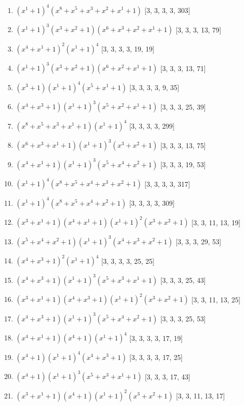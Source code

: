 \documentclass[10pt,twocolumn]{article}
\begin{document}
\begin{enumerate}
\item $(x^{1} + 1)^{4}(x^{8} + x^{5} + x^{3} + x^{2} + x^{1} + 1)$  [3, 3, 3, 3, 303]
\item $(x^{1} + 1)^{3}(x^{3} + x^{2} + 1)(x^{6} + x^{3} + x^{2} + x^{1} + 1)$  [3, 3, 3, 13, 79]
\item $(x^{4} + x^{1} + 1)^{2}(x^{1} + 1)^{4}$  [3, 3, 3, 3, 19, 19]
\item $(x^{1} + 1)^{3}(x^{3} + x^{2} + 1)(x^{6} + x^{2} + x^{1} + 1)$  [3, 3, 3, 13, 71]
\item $(x^{3} + 1)(x^{1} + 1)^{4}(x^{5} + x^{1} + 1)$  [3, 3, 3, 3, 9, 35]
\item $(x^{4} + x^{3} + 1)(x^{1} + 1)^{3}(x^{5} + x^{2} + x^{1} + 1)$  [3, 3, 3, 25, 39]
\item $(x^{8} + x^{5} + x^{3} + x^{1} + 1)(x^{1} + 1)^{4}$  [3, 3, 3, 3, 299]
\item $(x^{6} + x^{3} + x^{1} + 1)(x^{1} + 1)^{3}(x^{3} + x^{2} + 1)$  [3, 3, 3, 13, 75]
\item $(x^{4} + x^{1} + 1)(x^{1} + 1)^{3}(x^{5} + x^{4} + x^{2} + 1)$  [3, 3, 3, 19, 53]
\item $(x^{1} + 1)^{4}(x^{8} + x^{5} + x^{4} + x^{3} + x^{2} + 1)$  [3, 3, 3, 3, 317]
\item $(x^{1} + 1)^{4}(x^{8} + x^{5} + x^{4} + x^{2} + 1)$  [3, 3, 3, 3, 309]
\item $(x^{3} + x^{1} + 1)(x^{4} + x^{1} + 1)(x^{1} + 1)^{2}(x^{3} + x^{2} + 1)$  [3, 3, 11, 13, 19]
\item $(x^{5} + x^{4} + x^{2} + 1)(x^{1} + 1)^{3}(x^{4} + x^{3} + x^{2} + 1)$  [3, 3, 3, 29, 53]
\item $(x^{4} + x^{3} + 1)^{2}(x^{1} + 1)^{4}$  [3, 3, 3, 3, 25, 25]
\item $(x^{4} + x^{3} + 1)(x^{1} + 1)^{3}(x^{5} + x^{3} + x^{1} + 1)$  [3, 3, 3, 25, 43]
\item $(x^{3} + x^{1} + 1)(x^{4} + x^{3} + 1)(x^{1} + 1)^{2}(x^{3} + x^{2} + 1)$  [3, 3, 11, 13, 25]
\item $(x^{4} + x^{3} + 1)(x^{1} + 1)^{3}(x^{5} + x^{4} + x^{2} + 1)$  [3, 3, 3, 25, 53]
\item $(x^{4} + x^{1} + 1)(x^{4} + 1)(x^{1} + 1)^{4}$  [3, 3, 3, 3, 17, 19]
\item $(x^{4} + 1)(x^{1} + 1)^{4}(x^{4} + x^{3} + 1)$  [3, 3, 3, 3, 17, 25]
\item $(x^{4} + 1)(x^{1} + 1)^{3}(x^{5} + x^{3} + x^{1} + 1)$  [3, 3, 3, 17, 43]
\item $(x^{3} + x^{1} + 1)(x^{4} + 1)(x^{1} + 1)^{2}(x^{3} + x^{2} + 1)$  [3, 3, 11, 13, 17]

\end{enumerate}
\end{document}
